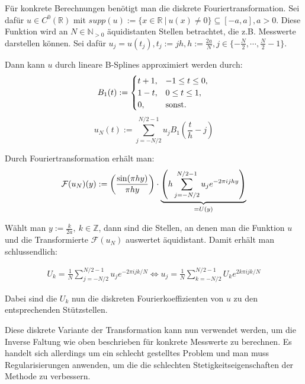 \documentclass{article}
\newcommand{\R}[0]{\mathbb{R}}
\theoremstyle{plain}
\theoremstyle{definition}
\begin{document}
Für konkrete Berechnungen benötigt man die diskrete Fouriertransformation. 
Sei dafür $u \in C^0(\R)$ mit $supp(u) := \{x \in \R \: | \: u(x) \neq 0 \} \subseteq [-a, a], a > 0$. Diese Funktion wird an $N \in \mathbb{N}_{>0}$ äquidistanten Stellen betrachtet, 
die z.B. Messwerte darstellen können. Sei dafür $u_j = u(t_j), t_j := jh, h:= \frac{2a}{N}, j \in \{-\frac{N}{2}, \cdots, \frac{N}{2} - 1\}$.

Dann kann $u$ durch lineare B-Splines approximiert werden durch:
\begin{equation}
    B_1(t) := \begin{cases}
        t + 1, &-1 \leq t \leq 0, \\
        1 - t, &0 \leq t \leq 1, \\
        0, &{\rm sonst}.
    \end{cases} \\
\end{equation}
\begin{equation}
    u_N(t) := \sum\limits_{j=-N/2}^{N/2-1} u_j B_1 \left(\frac{t}{h} - j\right)
\end{equation}

Durch Fouriertransformation erhält man:
\begin{equation}
    \mathcal{F}(u_N)(y) := \left(\frac{{\rm sin}(\pi h y)}{\pi h y}\right) \cdot \underbrace{\left(h \sum\limits_{j=-N/2}^{N/2-1} u_j e^{-2\pi i jhy}\right)}_{=U(y)}
\end{equation}

Wählt man $y := \frac{k}{2a}, \: k \in \mathbb{Z}$, dann sind die Stellen, an denen man die Funktion $u$ und die Transformierte $\mathcal{F}(u_N)$
auswertet äquidistant. Damit erhält man schlussendlich:

\begin{align}
    U_k = \frac{1}{N} \sum\limits_{j=-N/2}^{N/2-1} u_j e^{-2\pi ijk/N}
\iff u_j = \frac{1}{N} \sum\limits_{k=-N/2}^{N/2-1} U_k e^{2k\pi ijk/N}
\end{align}

Dabei sind die $U_k$ nun die diskreten Fourierkoeffizienten von $u$ zu den entsprechenden Stützstellen.

Diese diskrete Variante der Transformation kann nun verwendet werden, um die Inverse Faltung wie oben beschrieben für konkrete Messwerte zu berechnen. 
Es handelt sich allerdings um ein schlecht gestelltes Problem und man muss Regularisierungen anwenden, um die die schlechten Stetigkeitseigenschaften der Methode zu verbessern. 
\end{document}
